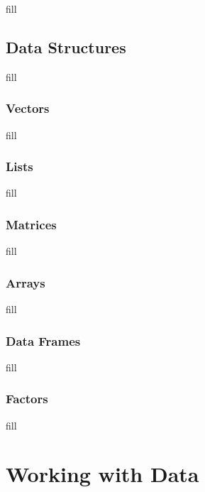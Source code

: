 \documentclass[
  b5paper]{book}
\begin{document}
fill

\hypertarget{data-structures}{%
\section{Data Structures}\label{data-structures}}

fill

\hypertarget{vectors}{%
\subsection*{Vectors}\label{vectors}}

fill

\hypertarget{lists}{%
\subsection*{Lists}\label{lists}}

fill

\hypertarget{matrices}{%
\subsection*{Matrices}\label{matrices}}

fill

\hypertarget{arrays}{%
\subsection*{Arrays}\label{arrays}}

fill

\hypertarget{data-frames}{%
\subsection*{Data Frames}\label{data-frames}}

fill

\hypertarget{factors}{%
\subsection*{Factors}\label{factors}}

fill

\hypertarget{working-with-data-1}{%
\chapter{Working with Data}\label{working-with-data-1}}
\end{document}
